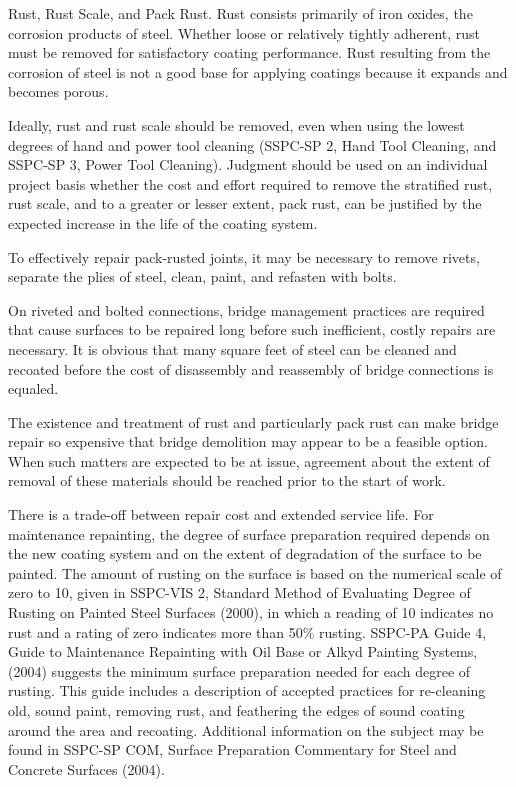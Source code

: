 Rust, Rust Scale, and Pack Rust. Rust consists primarily of iron oxides, the corrosion products of steel.
Whether loose or relatively tightly adherent, rust must be removed for satisfactory coating performance. Rust
resulting from the corrosion of steel is not a good base for applying coatings because it expands and becomes porous.

Ideally, rust and rust scale should be removed, even when using the lowest degrees of hand and power tool
cleaning (SSPC-SP 2, Hand Tool Cleaning, and SSPC-SP 3, Power Tool Cleaning). Judgment should be used on an
individual project basis whether the cost and effort required to remove the stratified rust, rust scale, and to a greater
or lesser extent, pack rust, can be justified by the expected increase in the life of the coating system.

To effectively repair pack-rusted joints, it may be necessary to remove rivets, separate the plies of steel, clean,
paint, and refasten with bolts.

On riveted and bolted connections, bridge management practices are required that cause surfaces to be repaired
long before such inefficient, costly repairs are necessary. It is obvious that many square feet of steel can be cleaned
and recoated before the cost of disassembly and reassembly of bridge connections is equaled.

The existence and treatment of rust and particularly pack rust can make bridge repair so expensive that bridge
demolition may appear to be a feasible option. When such matters are expected to be at issue, agreement about the
extent of removal of these materials should be reached prior to the start of work.

There is a trade-off between repair cost and extended service life. For maintenance repainting, the degree of
surface preparation required depends on the new coating system and on the extent of degradation of the surface to be
painted. The amount of rusting on the surface is based on the numerical scale of zero to 10, given in SSPC-VIS 2,
Standard Method of Evaluating Degree of Rusting on Painted Steel Surfaces (2000), in which a reading of 10
indicates no rust and a rating of zero indicates more than 50\% rusting. SSPC-PA Guide 4, Guide to Maintenance
Repainting with Oil Base or Alkyd Painting Systems, (2004) suggests the minimum surface preparation needed for
each degree of rusting. This guide includes a description of accepted practices for re-cleaning old, sound paint,
removing rust, and feathering the edges of sound coating around the area and recoating. Additional information on the subject may be found in SSPC-SP COM, Surface Preparation Commentary for Steel and Concrete Surfaces
(2004).

